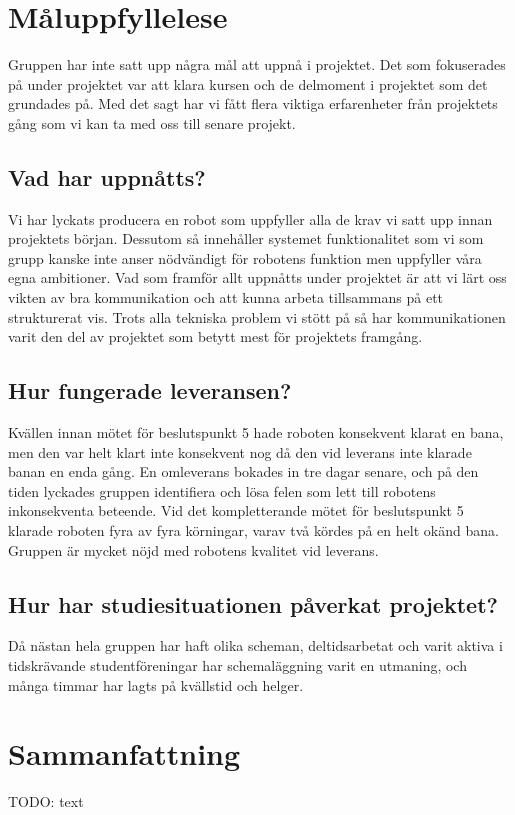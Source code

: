 \documentclass{article}
\begin{document}
\clearpage
\section{Måluppfyllelese}
Gruppen har inte satt upp några mål att uppnå i projektet. Det som fokuserades på under projektet var att klara kursen och de delmoment i projektet som det grundades på. Med det sagt har vi fått flera viktiga erfarenheter från projektets gång som vi kan ta med oss till senare projekt.

\subsection{Vad har uppnåtts?}
Vi har lyckats producera en robot som uppfyller alla de krav vi satt upp innan projektets början. Dessutom så innehåller systemet funktionalitet som vi som grupp kanske inte anser nödvändigt för robotens funktion men uppfyller våra egna ambitioner. Vad som framför allt uppnåtts under projektet är att vi lärt oss vikten av bra kommunikation och att kunna arbeta tillsammans på ett strukturerat vis. Trots alla tekniska problem vi stött på så har kommunikationen varit den del av projektet som betytt mest för projektets framgång.

\subsection{Hur fungerade leveransen?}
Kvällen innan mötet för beslutspunkt 5 hade roboten konsekvent klarat en bana, men den var helt klart inte konsekvent nog då den vid leverans inte klarade banan en enda gång. En omleverans bokades in tre dagar senare, och på den tiden lyckades gruppen identifiera och lösa felen som lett till robotens inkonsekventa beteende. Vid det kompletterande mötet för beslutspunkt 5 klarade roboten fyra av fyra körningar, varav två kördes på en helt okänd bana. Gruppen är mycket nöjd med robotens kvalitet vid leverans.

\subsection{Hur har studiesituationen påverkat projektet?}
Då nästan hela gruppen har haft olika scheman, deltidsarbetat och varit aktiva i tidskrävande studentföreningar har schemaläggning varit en utmaning, och många timmar har lagts på kvällstid och helger. 

\clearpage
\section{Sammanfattning}
TODO: text
\end{document}
